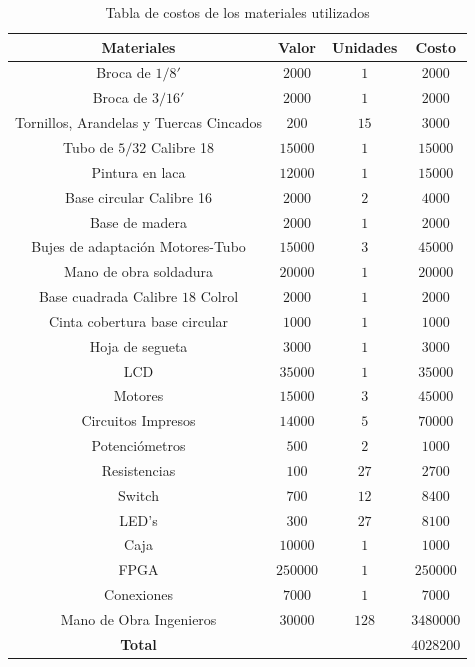 \documentclass[twocolumn]{IEEEtran}
\begin{document}
\begin{table}[H]
	\centering
\begin{tabular}[c]{|c|c|c|c|} \hline
\textbf{Materiales} & \textbf{Valor} & \textbf{Unidades} & \textbf{Costo} \\ \hline
Broca de $1/8'$ & $2000$ & $1$ & $2000$ \\%
Broca de $3/16'$ & $2000$ & $1$ & $2000$ \\%
Tornillos, Arandelas y Tuercas Cincados & $200$ & $15$ & $3000$ \\
Tubo de $5/32$ Calibre 18 & $15000$ & $1$ & $15000$ \\
Pintura en laca & $12000$ & $1$ & $15000$ \\ 
Base circular Calibre 16 & $2000$ & $2$ & $4000$ \\
Base de madera & $2000$ & $1$ & $2000$ \\
Bujes de adaptación Motores-Tubo  & $15000$ & $3$ & $45000$ \\
Mano de obra soldadura & $20000$ & $1$ & $20000$ \\
Base cuadrada Calibre $18$ Colrol & $2000$ & $1$ & $2000$ \\
Cinta cobertura base circular & $1000$ & $1$ & $1000$ \\
Hoja de segueta & $3000$ & $1$ & $3000$ \\
LCD & $35000$ & $1$ & $35000$ \\
Motores & $15000$ & $3$ & $45000$ \\
Circuitos Impresos & $14000$ & $5$ & $70000$ \\
Potenciómetros & $500$ & $2$ & $1000$ \\
Resistencias & $100$ & $27$ & $2700$ \\
Switch & $700$ & $12$ & $8400$ \\
LED's & $300$ & $27$ & $8100$ \\
Caja & $10000$ & $1$ & $1000$ \\
FPGA & $250000$ & $1$ & $250000$ \\
Conexiones & $7000$ & $1$ & $7000$ \\
Mano de Obra Ingenieros & $30000$ & $128$ & $3480000$\\ \hline
\textbf{Total} &  &  & $4028200$ \\ \hline
\end{tabular}
	\caption{Tabla de costos de los materiales utilizados}
	\label{tabcosto}
\end{table}
\end{document}
